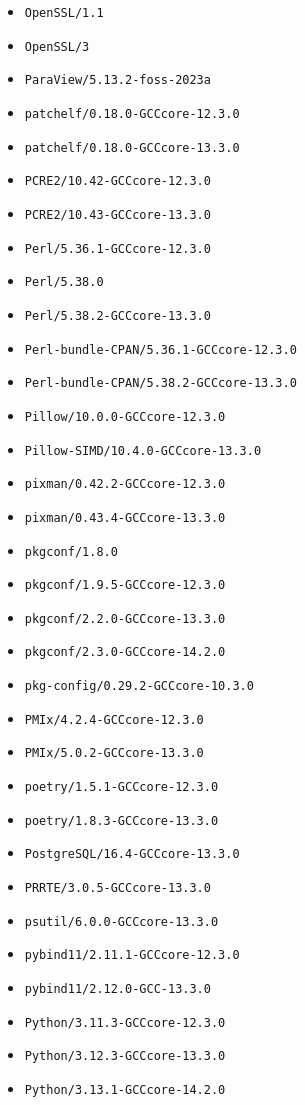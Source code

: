 \begin{multicols}{3}
\begin{itemize}
\item \verb|OpenSSL/1.1|
\item \verb|OpenSSL/3|
\item \verb|ParaView/5.13.2-foss-2023a|
\item \verb|patchelf/0.18.0-GCCcore-12.3.0|
\item \verb|patchelf/0.18.0-GCCcore-13.3.0|
\item \verb|PCRE2/10.42-GCCcore-12.3.0|
\item \verb|PCRE2/10.43-GCCcore-13.3.0|
\item \verb|Perl/5.36.1-GCCcore-12.3.0|
\item \verb|Perl/5.38.0|
\item \verb|Perl/5.38.2-GCCcore-13.3.0|
\item \verb|Perl-bundle-CPAN/5.36.1-GCCcore-12.3.0|
\item \verb|Perl-bundle-CPAN/5.38.2-GCCcore-13.3.0|
\item \verb|Pillow/10.0.0-GCCcore-12.3.0|
\item \verb|Pillow-SIMD/10.4.0-GCCcore-13.3.0|
\item \verb|pixman/0.42.2-GCCcore-12.3.0|
\item \verb|pixman/0.43.4-GCCcore-13.3.0|
\item \verb|pkgconf/1.8.0|
\item \verb|pkgconf/1.9.5-GCCcore-12.3.0|
\item \verb|pkgconf/2.2.0-GCCcore-13.3.0|
\item \verb|pkgconf/2.3.0-GCCcore-14.2.0|
\item \verb|pkg-config/0.29.2-GCCcore-10.3.0|
\item \verb|PMIx/4.2.4-GCCcore-12.3.0|
\item \verb|PMIx/5.0.2-GCCcore-13.3.0|
\item \verb|poetry/1.5.1-GCCcore-12.3.0|
\item \verb|poetry/1.8.3-GCCcore-13.3.0|
\item \verb|PostgreSQL/16.4-GCCcore-13.3.0|
\item \verb|PRRTE/3.0.5-GCCcore-13.3.0|
\item \verb|psutil/6.0.0-GCCcore-13.3.0|
\item \verb|pybind11/2.11.1-GCCcore-12.3.0|
\item \verb|pybind11/2.12.0-GCC-13.3.0|
\item \verb|Python/3.11.3-GCCcore-12.3.0|
\item \verb|Python/3.12.3-GCCcore-13.3.0|
\item \verb|Python/3.13.1-GCCcore-14.2.0|

\end{itemize}
\end{multicols}

